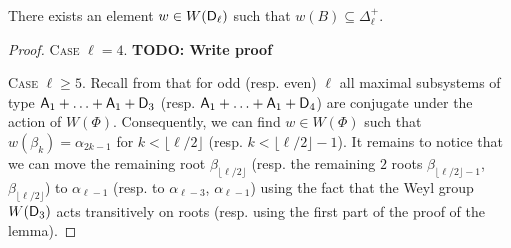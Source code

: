 \begin{lemma}\label{lemma:nikolov-weyl} There exists an element $w\in W(\mathsf{D}_\ell)$ such that $w(B) \subseteq \Delta_\ell^+$. \end{lemma}
\begin{proof}
\textsc{Case $\ell=4$.} \textbf{TODO: Write proof}

\textsc{Case $\ell \geq 5$.}
Recall from \cite[Table~9]{Dy72} that for odd (resp. even) $\ell$ all maximal subsystems of type $\mathsf{A}_1+\ldots+\mathsf{A}_1+\mathsf{D}_3$
(resp. $\mathsf{A}_1+\ldots+\mathsf{A}_1+\mathsf{D}_4$) are conjugate under the action of $W(\Phi)$. Consequently, we can find $w\in W(\Phi)$
such that $w(\beta_k) = \alpha_{2k-1}$ for $k < \lfloor\ell/2\rfloor$ (resp. $k < \lfloor\ell/2\rfloor-1$). It remains to
notice that we can move the remaining root $\beta_{\lfloor\ell/2\rfloor}$ 
(resp. the remaining $2$ roots $\beta_{\lfloor\ell/2\rfloor-1}$, $\beta_{\lfloor\ell/2\rfloor}$) to
$\alpha_{\ell-1}$ (resp. to $\alpha_{\ell-3}$, $\alpha_{\ell-1}$) using the fact that the Weyl group $W(\mathsf{D}_3)$ acts
transitively on roots (resp. using the first part of the proof of the lemma). \end{proof}

